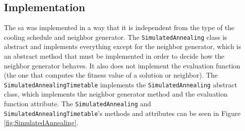 \subsection{Implementation}

The \gls{sa} was implemented in a way that it is independent from the type of the cooling schedule and neighbor generator. The \verb+SimulatedAnnealing+ class is abstract and implements everything except for the neighbor generator, which is an abstract method that must be implemented in order to decide how the neighbor generator behaves. It also does not implement the evaluation function (the one that computes the fitness value of a solution or neighbor). The \verb+SimulatedAnnealingTimetable+ implements the \verb+SimulatedAnnealing+ abstract class, which implements the neighbor generator method and the evaluation function attribute. The \verb+SimulatedAnnealing+ and \verb+SimulatedAnnealingTimetable+'s methods and attributes can be seen in Figure \ref{fig:SimulatedAnnealing}.\\
\\
